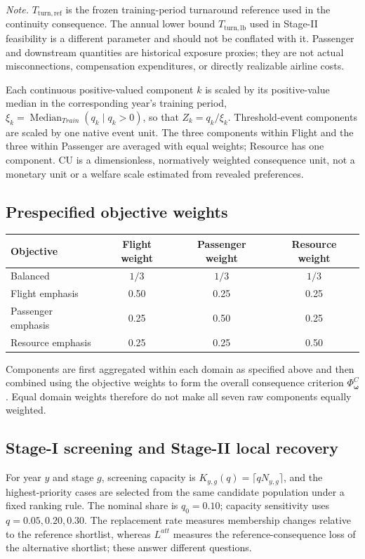 \documentclass[10pt,a4paper]{article}
\numberwithin{equation}{section}
\begin{document}
\normalsize
\noindent\textit{Note.} $T_{\mathrm{turn,ref}}$ is the frozen training-period turnaround reference used in the continuity consequence. The annual lower bound $T_{\mathrm{turn,lb}}$ used in Stage-II feasibility is a different parameter and should not be conflated with it. Passenger and downstream quantities are historical exposure proxies; they are not actual misconnections, compensation expenditures, or directly realizable airline costs.

Each continuous positive-valued component $k$ is scaled by its positive-value median in the corresponding year's training period, $\xi_k=\operatorname{Median}_{Train}(q_k\mid q_k>0)$, so that $Z_k=q_k/\xi_k$. Threshold-event components are scaled by one native event unit. The three components within Flight and the three within Passenger are averaged with equal weights; Resource has one component. CU is a dimensionless, normatively weighted consequence unit, not a monetary unit or a welfare scale estimated from revealed preferences.

\subsection{Prespecified objective weights}
\begin{center}
\small
\begin{tabular}{lccc}
\toprule
Objective & Flight weight & Passenger weight & Resource weight \\
\midrule
Balanced & $1/3$ & $1/3$ & $1/3$ \\
Flight emphasis & 0.50 & 0.25 & 0.25 \\
Passenger emphasis & 0.25 & 0.50 & 0.25 \\
Resource emphasis & 0.25 & 0.25 & 0.50 \\
\bottomrule
\end{tabular}
\end{center}
Components are first aggregated within each domain as specified above and then combined using the objective weights to form the overall consequence criterion $\Phi^C_{\boldsymbol\omega}$. Equal domain weights therefore do not make all seven raw components equally weighted.

\subsection{Stage-I screening and Stage-II local recovery}
For year $y$ and stage $g$, screening capacity is $K_{y,g}(q)=\lceil qN_{y,g}\rceil$, and the highest-priority cases are selected from the same candidate population under a fixed ranking rule. The nominal share is $q_0=0.10$; capacity sensitivity uses $q=0.05,0.20,0.30$. The replacement rate measures membership changes relative to the reference shortlist, whereas $L^{att}$ measures the reference-consequence loss of the alternative shortlist; these answer different questions.
\end{document}
